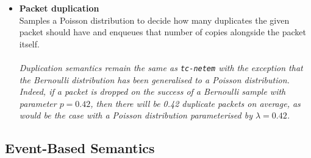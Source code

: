 \begin{itemize}
    \item \textbf{Packet duplication} \\
    Samples a Poisson distribution to decide how many duplicates the given packet should have and enqueues that
    number of copies alongside the packet itself. \\ \\
    \emph{Duplication semantics remain the same as \texttt{tc-netem} with the exception that the Bernoulli distribution
    has been generalised to a Poisson distribution. Indeed, if a packet is dropped on the success of a Bernoulli
    sample with parameter $p = 0.42$, then there will be 0.42 duplicate packets on average, as would be the case with
    a Poisson distribution parameterised by $\lambda = 0.42$.}
\end{itemize}

\newpage

\subsection{Event-Based Semantics}

